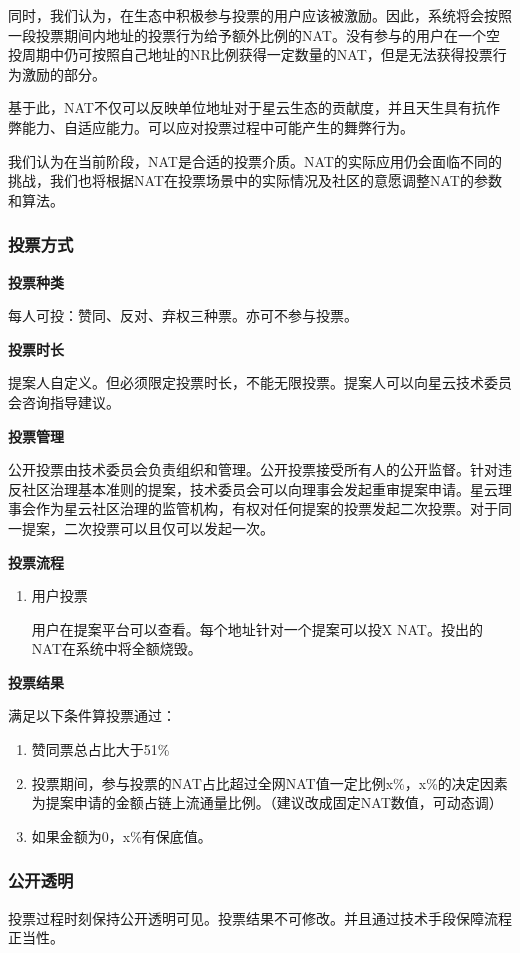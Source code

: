 同时，我们认为，在生态中积极参与投票的用户应该被激励。因此，系统将会按照一段投票期间内地址的投票行为给予额外比例的NAT。没有参与的用户在一个空投周期中仍可按照自己地址的NR比例获得一定数量的NAT，但是无法获得投票行为激励的部分。

基于此，NAT不仅可以反映单位地址对于星云生态的贡献度，并且天生具有抗作弊能力、自适应能力。可以应对投票过程中可能产生的舞弊行为。

我们认为在当前阶段，NAT是合适的投票介质。NAT的实际应用仍会面临不同的挑战，我们也将根据NAT在投票场景中的实际情况及社区的意愿调整NAT的参数和算法。

\subsubsection{投票方式}
\textbf{投票种类}

每人可投：赞同、反对、弃权三种票。亦可不参与投票。

\textbf{投票时长}

提案人自定义。但必须限定投票时长，不能无限投票。提案人可以向星云技术委员会咨询指导建议。

\textbf{投票管理}

公开投票由技术委员会负责组织和管理。公开投票接受所有人的公开监督。针对违反社区治理基本准则的提案，技术委员会可以向理事会发起重审提案申请。星云理事会作为星云社区治理的监管机构，有权对任何提案的投票发起二次投票。对于同一提案，二次投票可以且仅可以发起一次。

\textbf{投票流程}
\begin{enumerate}

\item 用户投票

用户在提案平台可以查看。每个地址针对一个提案可以投X NAT。投出的NAT在系统中将全额烧毁。

\end{enumerate}

\textbf{投票结果}

满足以下条件算投票通过：

\begin{enumerate}
\item 赞同票总占比大于51\%
\item 投票期间，参与投票的NAT占比超过全网NAT值一定比例x\%，x\%的决定因素为提案申请的金额占链上流通量比例。{\color{red}（建议改成固定NAT数值，可动态调）}
\item 如果金额为0，x\%有保底值。
\end{enumerate}

\subsubsection{公开透明}
投票过程时刻保持公开透明可见。投票结果不可修改。并且通过技术手段保障流程正当性。

